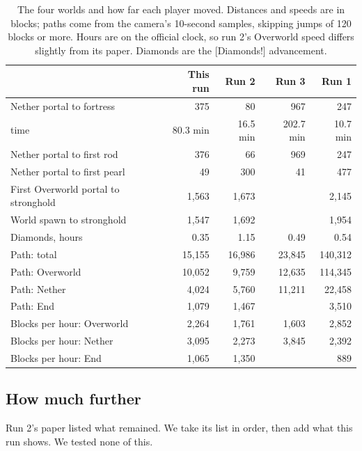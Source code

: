 \documentclass[11pt,a4paper]{article}
\newcommand{\adv}[1]{\mbox{\textsf{[#1]}}}
\begin{document}
\begin{table}[t]
  \caption{The four worlds and how far each player moved. Distances and speeds are in blocks; paths come from the camera's 10-second samples, skipping jumps of 120 blocks or more. Hours are on the official clock, so run 2's Overworld speed differs slightly from its paper. Diamonds are the \adv{Diamonds!} advancement.}
  \label{tab:worlds}
  \small
  \begin{tabularx}{\textwidth}{@{}Xrrrr@{}}
    \toprule
    & \textbf{This run} & \textbf{Run 2} & \textbf{Run 3} & \textbf{Run 1} \\
    \midrule
    Nether portal to fortress & 375 & 80 & 967 & 247 \\
    \quad time & 80.3 min & 16.5 min & 202.7 min & 10.7 min \\
    Nether portal to first rod & 376 & 66 & 969 & 247 \\
    Nether portal to first pearl & 49 & 300 & 41 & 477 \\
    First Overworld portal to stronghold & 1,563 & 1,673 & & 2,145 \\
    World spawn to stronghold & 1,547 & 1,692 & & 1,954 \\
    Diamonds, hours & 0.35 & 1.15 & 0.49 & 0.54 \\
    \midrule
    Path: total & 15,155 & 16,986 & 23,845 & 140,312 \\
    Path: Overworld & 10,052 & 9,759 & 12,635 & 114,345 \\
    Path: Nether & 4,024 & 5,760 & 11,211 & 22,458 \\
    Path: End & 1,079 & 1,467 & & 3,510 \\
    Blocks per hour: Overworld & 2,264 & 1,761 & 1,603 & 2,852 \\
    Blocks per hour: Nether & 3,095 & 2,273 & 3,845 & 2,392 \\
    Blocks per hour: End & 1,065 & 1,350 & & 889 \\
    \bottomrule
  \end{tabularx}
\end{table}

\subsection{How much further}

Run 2's paper listed what remained. We take its list in order, then add what this run shows. We tested none of this.
\end{document}
